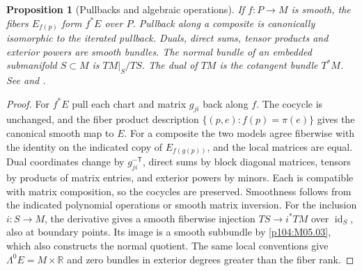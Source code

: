 \documentclass[11pt,oneside,openany]{book}
\newtheorem{proposition}[theorem]{Proposition}
\theoremstyle{definition}
\theoremstyle{remark}
\newcommand{\R}{\mathbb R}
\DeclareMathOperator{\id}{id}
\begin{document}
\begin{proposition}[Pullbacks and algebraic operations]\label{p104:M05.04}
If \(f:P\to M\) is smooth, the fibers \(E_{f(p)}\) form \(f^*E\) over \(P\). Pullback along a composite is canonically isomorphic to the iterated pullback. Duals, direct sums, tensor products and exterior powers are smooth bundles. The normal bundle of an embedded submanifold \(S\subset M\) is \(TM|_S/TS\). The dual of \(TM\) is the cotangent bundle \(T^*M\). See \cite[Chapters 10--12]{lee} and \cite[\S\S17--18]{tu}.
\end{proposition}
\begin{proof}
For \(f^*E\) pull each chart and matrix \(g_{ji}\) back along \(f\). The cocycle is unchanged, and the fiber product description \(\{(p,e):f(p)=\pi(e)\}\) gives the canonical smooth map to \(E\). For a composite the two models agree fiberwise with the identity on the indicated copy of \(E_{f(g(p))}\), and the local matrices are equal. Dual coordinates change by \(g_{ji}^{-\mathsf T}\), direct sums by block diagonal matrices, tensors by products of matrix entries, and exterior powers by minors. Each is compatible with matrix composition, so the cocycles are preserved. Smoothness follows from the indicated polynomial operations or smooth matrix inversion. For the inclusion \(i:S\to M\), the derivative gives a smooth fiberwise injection \(TS\to i^*TM\) over \(\id_S\), also at boundary points. Its image is a smooth subbundle by \cref{p104:M05.03}, which also constructs the normal quotient. The same local conventions give \(\Lambda^0 E=M\times\R\) and zero bundles in exterior degrees greater than the fiber rank.
\end{proof}
\end{document}
